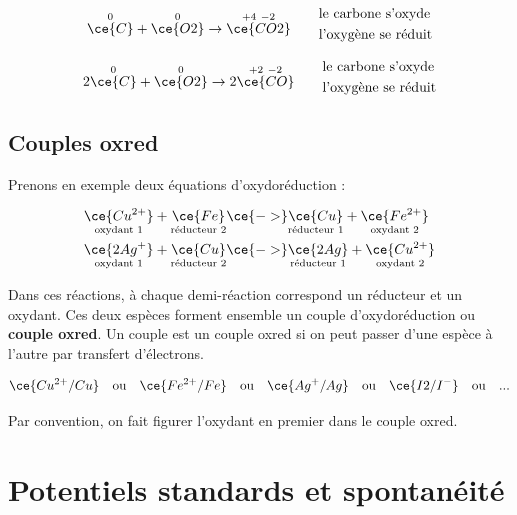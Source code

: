 \documentclass[
  11pt,
  a4paper,
  openany]{book}
\begin{document}
\begin{Answer}
\[
\begin{split}
\overset{0}{\ce{C}} + \overset{0}{\ce{O2}} \rightarrow \overset{+4\ -2}{\ce{CO2}}
\end{split}
\qquad
\begin{split}
  &\text{le carbone s'oxyde} \\
  &\text{l'oxygène se réduit}
\end{split}
\]

\[
\begin{split}
2\overset{0}{\ce{C}} + \overset{0}{\ce{O2}} \rightarrow 2\overset{+2\ -2}{\ce{CO}}
\end{split}
\qquad
\begin{split}
  &\text{le carbone s'oxyde} \\
  &\text{l'oxygène se réduit}
\end{split}
\]

\end{Answer}

\subsection{Couples oxred}\label{couples-oxred}

Prenons en exemple deux équations d'oxydoréduction :

\[
\begin{split}
\underset{\text{oxydant 1}}{\ce{Cu^{2+}}} + \underset{\text{réducteur 2}}{\ce{Fe}} &\ce{->}
\underset{\text{réducteur 1}}{\ce{Cu}} + \underset{\text{oxydant 2}}{\ce{Fe^{2+}}} \\
\underset{\text{oxydant 1}}{\ce{2Ag^{+}}} + \underset{\text{réducteur 2}}{\ce{Cu}} &\ce{->}
\underset{\text{réducteur 1}}{\ce{2Ag}} + \underset{\text{oxydant 2}}{\ce{Cu^{2+}}}
\end{split}
\]

Dans ces réactions, à chaque demi-réaction correspond un réducteur et un oxydant. Ces deux espèces forment ensemble un couple d'oxydoréduction ou \textbf{couple oxred}. Un couple est un couple oxred si on peut passer d'une espèce à l'autre par transfert d'électrons.

\[
  \ce{Cu^{2+}/Cu} \quad\text{ou}\quad \ce{Fe^{2+}/Fe} \quad\text{ou}\quad \ce{Ag^{+}/Ag} \quad\text{ou}\quad \ce{I2/I^{-}} \quad\text{ou}\quad ...
\]

Par convention, on fait figurer l'oxydant en premier dans le couple oxred.

\section{Potentiels standards et spontanéité}\label{potentiels-standards-et-spontanuxe9ituxe9}
\end{document}
